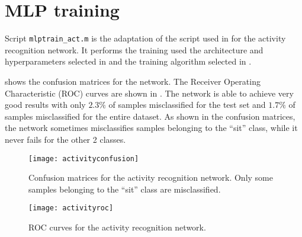 \section{MLP training}\label{sec:activitytraining}

Script \texttt{mlptrain\_act.m} is the adaptation of the script used in
 for the activity recognition network. It performs the
training used the architecture and hyperparameters selected in
 and the training algorithm selected in
 .

 shows the confusion matrices for the network.
The Receiver Operating Characteristic (ROC) curves are shown in
. The network is able to achieve very good results
with only \(2.3\%\) of samples misclassified for the test set and \(1.7\%\) of
samples misclassified for the entire dataset. As shown in the confusion
matrices, the network sometimes misclassifies samples belonging to the ``sit''
class, while it never fails for the other 2 classes.

\begin{figure}[htbp]
	\centering
	\texttt{[image: activityconfusion]}
	\caption{Confusion matrices for the activity recognition
	network. Only some samples belonging to the ``sit'' class are
	misclassified.}\label{fig:activityconfusion}
\end{figure}

\begin{figure}[htbp]
	\centering
	\texttt{[image: activityroc]}
	\caption{ROC curves for the activity recognition
	network.}\label{fig:activityroc}
\end{figure}

